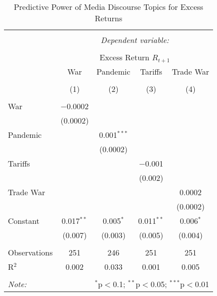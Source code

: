 
\begin{table}[!htbp] \centering 
  \caption{Predictive Power of Media Discourse Topics for Excess Returns} 
  \label{} 
\begin{tabular}{@{\extracolsep{5pt}}lcccc} 
\\[-1.8ex]\hline 
\hline \\[-1.8ex] 
 & \multicolumn{4}{c}{\textit{Dependent variable:}} \\ 
\cline{2-5} 
\\[-1.8ex] & \multicolumn{4}{c}{Excess Return $R_{t+1}$} \\ 
 & War & Pandemic & Tariffs & Trade War \\ 
\\[-1.8ex] & (1) & (2) & (3) & (4)\\ 
\hline \\[-1.8ex] 
 War & $-$0.0002 &  &  &  \\ 
  & (0.0002) &  &  &  \\ 
  Pandemic &  & 0.001$^{***}$ &  &  \\ 
  &  & (0.0002) &  &  \\ 
  Tariffs &  &  & $-$0.001 &  \\ 
  &  &  & (0.002) &  \\ 
  Trade War &  &  &  & 0.0002 \\ 
  &  &  &  & (0.0002) \\ 
  Constant & 0.017$^{**}$ & 0.005$^{*}$ & 0.011$^{**}$ & 0.006$^{*}$ \\ 
  & (0.007) & (0.003) & (0.005) & (0.004) \\ 
 \hline \\[-1.8ex] 
Observations & 251 & 246 & 251 & 251 \\ 
R$^{2}$ & 0.002 & 0.033 & 0.001 & 0.005 \\ 
\hline 
\hline \\[-1.8ex] 
\textit{Note:}  & \multicolumn{4}{r}{$^{*}$p$<$0.1; $^{**}$p$<$0.05; $^{***}$p$<$0.01} \\ 
\end{tabular} 
\end{table} 
